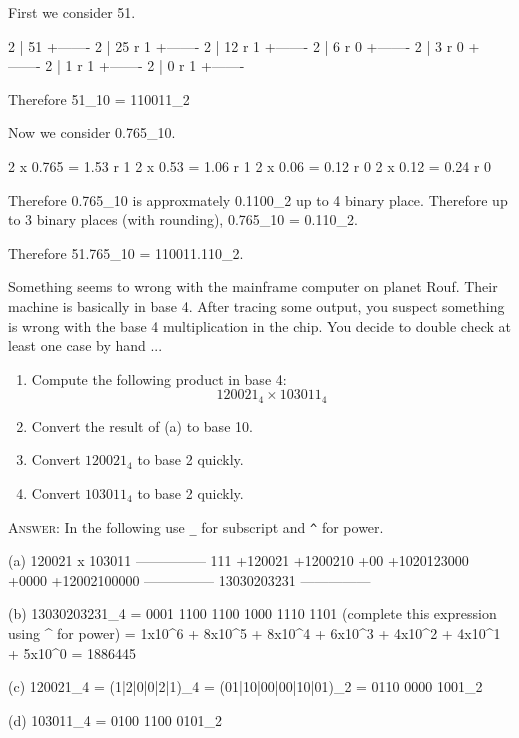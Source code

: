 \begin{answercode}
First we consider 51.

    2 | 51
      +-------
    2 | 25 r 1
      +-------
    2 | 12 r 1
      +-------
    2 |  6 r 0
      +-------
    2 |  3 r 0
      +-------  
    2 |  1 r 1
      +-------
    2 |  0 r 1
      +-------
      
Therefore 51_{10} = 110011_2

Now we consider 0.765_{10}.

      2 x 0.765 = 1.53 r 1
      2 x 0.53  = 1.06 r 1
      2 x 0.06  = 0.12 r 0
      2 x 0.12  = 0.24 r 0

Therefore 0.765_{10} is approxmately 0.1100_{2} up to 4 binary place.
Therefore up to 3 binary places (with rounding), 0.765_{10} = 0.110_{2}.

Therefore 51.765_{10} = 110011.110_{2}.
\end{answercode}

\newpage
\nextq
Something seems to wrong with the mainframe computer on planet Rouf.
Their machine is basically in base 4.
After tracing some output, you suspect something is wrong with the base 4
multiplication in the chip.
You decide to double check at least one case by hand ...
\begin{enumerate}
\item[(a)] Compute the following product in base 4:
\[
120021_4 \times  103011_4
\]
\item[(b)] Convert the result of (a) to base 10.
\item[(c)] Convert $120021_4$ to base 2 quickly.
\item[(d)] Convert $103011_4$ to base 2 quickly.
\end{enumerate}

\textsc{Answer:}
In the following use \verb!_! for subscript and \verb!^! for power.


\begin{answercode}
(a)
                    120021
                  x 103011
           ---------------
                  111
                   +120021
                  +1200210
                       +00
               +1020123000
                     +0000
              +12002100000
           ---------------
               13030203231
           ---------------

(b) 13030203231_4 = 0001 1100 1100 1000 1110 1101 (complete this expression using ^ for power)
            = 1x10^6 + 8x10^5 + 8x10^4 + 6x10^3 + 4x10^2 + 4x10^1 + 5x10^0
            = 1886445

(c) 120021_4 = (1|2|0|0|2|1)_4
             = (01|10|00|00|10|01)_2
             = 0110 0000 1001_2

(d) 103011_4 = 0100 1100 0101_2

\end{answercode}


